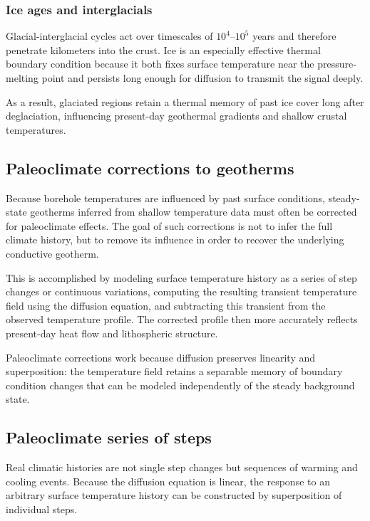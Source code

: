 \subsubsection*{Ice ages and interglacials}

Glacial-interglacial cycles act over timescales of $10^4$--$10^5$ years and therefore penetrate kilometers into the crust. Ice is an especially effective thermal boundary condition because it both fixes surface temperature near the pressure-melting point and persists long enough for diffusion to transmit the signal deeply.

As a result, glaciated regions retain a thermal memory of past ice cover long after deglaciation, influencing present-day geothermal gradients and shallow crustal temperatures.

\subsection{Paleoclimate corrections to geotherms}

Because borehole temperatures are influenced by past surface conditions, steady-state geotherms inferred from shallow temperature data must often be corrected for paleoclimate effects. The goal of such corrections is not to infer the full climate history, but to remove its influence in order to recover the underlying conductive geotherm.

This is accomplished by modeling surface temperature history as a series of step changes or continuous variations, computing the resulting transient temperature field using the diffusion equation, and subtracting this transient from the observed temperature profile. The corrected profile then more accurately reflects present-day heat flow and lithospheric structure.

Paleoclimate corrections work because diffusion preserves linearity and superposition: the temperature field retains a separable memory of boundary condition changes that can be modeled independently of the steady background state.

\subsection{Paleoclimate series of steps}

Real climatic histories are not single step changes but sequences of warming and cooling events. Because the diffusion equation is linear, the response to an arbitrary surface temperature history can be constructed by superposition of individual steps.

